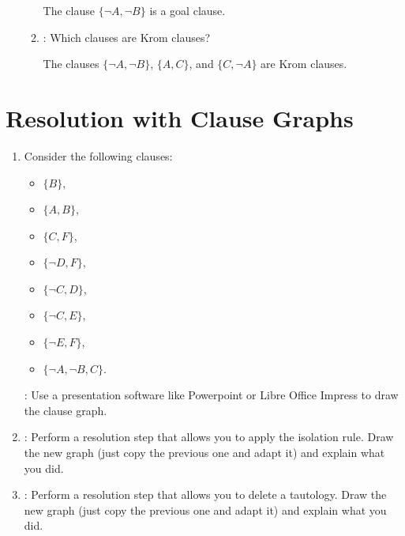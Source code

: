\documentclass{acAssignment}
\begin{document}
\begin{enumerate}
\begin{enumerate}
                \begin{acSolution}
                    The clause $\{\lnot A, \lnot B\}$ is a goal clause.
                \end{acSolution}
            
            \item {}: Which clauses are Krom clauses?
            
                \begin{acSolution}
                    The clauses $\{\lnot A, \lnot B\}$, $\{A, C\}$, and $\{C, \lnot A\}$ are Krom clauses.
                \end{acSolution}
        \end{enumerate}
\end{enumerate}

\section{Resolution with Clause Graphs}

\begin{enumerate}
    \item Consider the following clauses:
    
        \begin{itemize}
           \item $\{B\}$,
           \item $\{A, B\}$,
           \item $\{C, F\}$,
           \item $\{\lnot D, F\}$,
           \item $\{\lnot C, D\}$,
           \item $\{\lnot C, E\}$,
           \item $\{\lnot E, F\}$,
           \item $\{\lnot A, \lnot B, C\}$.
        \end{itemize}
        
        :
        Use a presentation software like Powerpoint or Libre Office Impress to draw the clause graph.
    
    \item {}:
        Perform a resolution step that allows you to apply the isolation rule.
        Draw the new graph (just copy the previous one and adapt it) and explain what you did.
    
    \item {}:
        Perform a resolution step that allows you to delete a tautology.
        Draw the new graph (just copy the previous one and adapt it) and explain what you did.
\end{enumerate}
\end{document}
